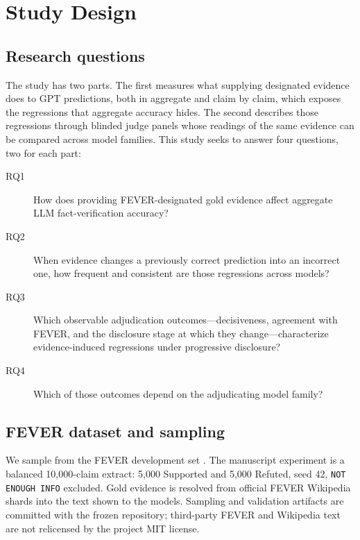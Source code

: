 \section{Study Design}
\label{sec:design}

\subsection{Research questions}
\label{sec:rqs}
The study has two parts.
The first measures what supplying designated evidence does to GPT predictions, both in aggregate and claim by claim, which exposes the regressions that aggregate accuracy hides.
The second describes those regressions through blinded judge panels whose readings of the same evidence can be compared across model families.
This study seeks to answer four questions, two for each part:
\begin{description}
\item[RQ1] How does providing FEVER-designated gold evidence affect aggregate LLM fact-verification accuracy?
\item[RQ2] When evidence changes a previously correct prediction into an incorrect one, how frequent and consistent are those regressions across models?
\item[RQ3] Which observable adjudication outcomes---decisiveness, agreement with FEVER, and the disclosure stage at which they change---characterize evidence-induced regressions under progressive disclosure?
\item[RQ4] Which of those outcomes depend on the adjudicating model family?
\end{description}

\subsection{FEVER dataset and sampling}
We sample from the FEVER development set \citep{thorne-etal-2018-fever}.
The manuscript experiment is a balanced 10{,}000-claim extract: 5{,}000 Supported and 5{,}000 Refuted, seed 42, \texttt{NOT ENOUGH INFO} excluded.
Gold evidence is resolved from official FEVER Wikipedia shards into the text shown to the models.
Sampling and validation artifacts are committed with the frozen repository; third-party FEVER and Wikipedia text are not relicensed by the project MIT license.

